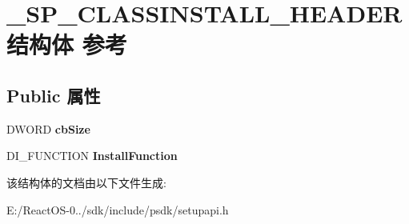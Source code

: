 \hypertarget{struct___s_p___c_l_a_s_s_i_n_s_t_a_l_l___h_e_a_d_e_r}{}\section{\+\_\+\+S\+P\+\_\+\+C\+L\+A\+S\+S\+I\+N\+S\+T\+A\+L\+L\+\_\+\+H\+E\+A\+D\+E\+R结构体 参考}
\label{struct___s_p___c_l_a_s_s_i_n_s_t_a_l_l___h_e_a_d_e_r}
\subsection*{Public 属性}
\begin{DoxyCompactItemize}
\item 
\mbox{\label{struct___s_p___c_l_a_s_s_i_n_s_t_a_l_l___h_e_a_d_e_r_a000c6309bb7ce10ff446728568802c9c}} 
D\+W\+O\+RD {\bfseries cb\+Size}
\item 
\mbox{\label{struct___s_p___c_l_a_s_s_i_n_s_t_a_l_l___h_e_a_d_e_r_abae2587c9708e8584298517cbb07c766}} 
D\+I\+\_\+\+F\+U\+N\+C\+T\+I\+ON {\bfseries Install\+Function}
\end{DoxyCompactItemize}


该结构体的文档由以下文件生成\+:\begin{DoxyCompactItemize}
\item 
E\+:/\+React\+O\+S-\/0../sdk/include/psdk/setupapi.\+h\end{DoxyCompactItemize}
